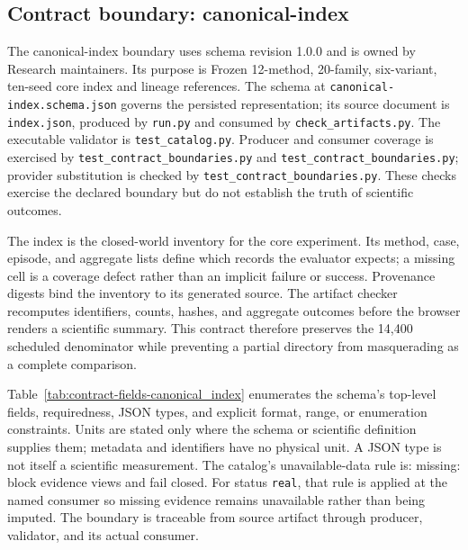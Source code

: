 \subsection{Contract boundary: canonical-index}\label{sec:contract-canonical_index}
The canonical-index boundary uses schema revision 1.0.0 and is owned by Research maintainers. Its purpose is Frozen 12-method, 20-family, six-variant, ten-seed core index and lineage references. The schema at \texttt{canonical-index.schema.json} governs the persisted representation; its source document is \texttt{index.json}, produced by \texttt{run.py} and consumed by \texttt{check\_\allowbreak{}artifacts.py}. The executable validator is \texttt{test\_\allowbreak{}catalog.py}. Producer and consumer coverage is exercised by \texttt{test\_\allowbreak{}contract\_\allowbreak{}boundaries.py} and \texttt{test\_\allowbreak{}contract\_\allowbreak{}boundaries.py}; provider substitution is checked by \texttt{test\_\allowbreak{}contract\_\allowbreak{}boundaries.py}. These checks exercise the declared boundary but do not establish the truth of scientific outcomes.

The index is the closed-world inventory for the core experiment. Its method, case, episode, and aggregate lists define which records the evaluator expects; a missing cell is a coverage defect rather than an implicit failure or success. Provenance digests bind the inventory to its generated source. The artifact checker recomputes identifiers, counts, hashes, and aggregate outcomes before the browser renders a scientific summary. This contract therefore preserves the 14,400 scheduled denominator while preventing a partial directory from masquerading as a complete comparison.

Table~\ref{tab:contract-fields-canonical_index} enumerates the schema's top-level fields, requiredness, JSON types, and explicit format, range, or enumeration constraints. Units are stated only where the schema or scientific definition supplies them; metadata and identifiers have no physical unit. A JSON type is not itself a scientific measurement. The catalog's unavailable-data rule is: missing: block evidence views and fail closed. For status \texttt{real}, that rule is applied at the named consumer so missing evidence remains unavailable rather than being imputed. The boundary is traceable from source artifact through producer, validator, and its actual consumer.

